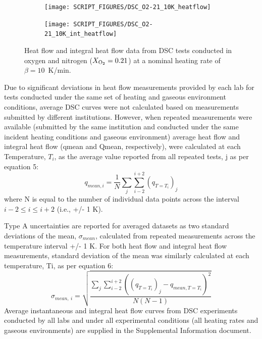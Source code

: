 \documentclass{book}
\begin{document}
\begin{figure}
\centering
\begin{subfigure}[b]{0.85\textwidth}
   \texttt{[image: SCRIPT\_FIGURES/DSC\_O2-21\_10K\_heatflow]}
   \caption{}
   \label{Fig:DSC_O2-21_10K_heatflow}
\end{subfigure}

\begin{subfigure}[b]{0.85\textwidth}
   \texttt{[image: SCRIPT\_FIGURES/DSC\_O2-21\_10K\_int\_heatflow]}
   \caption{}
   \label{Fig:DSC_O2-21_10K_int_heatflow}
\end{subfigure}

  \caption{Heat flow and integral heat flow data from DSC tests conducted in oxygen and nitrogen ($X_{\rm O_2}=0.21$) at a nominal heating rate of $\beta=10$~K/min.}
  \label{Fig:DSC_O2-21_10K}
\end{figure}



Due to significant deviations  in heat flow measurements provided by each lab for tests conducted under the same set of heating and gaseous environment conditions, average DSC curves were not calculated based on measurements submitted by different institutions. However, when repeated measurements were available (submitted by the same institution and conducted under the same incident heating conditions and gaseous environment) average heat flow and integral heat flow (qmean and Qmean, respectively), were calculated at each Temperature, $T_i$, as the average value reported from all repeated tests, j  as per equation 5:
\begin{equation}
   q_{mean,i}=\frac{1}{N}\sum_{j}\sum_{i-2}^{i+2}\left(q_{T=T_i}\right)_j
\end{equation}
where N is equal to the number of individual data points across the interval $i-2 \le i \le i+2$ (i.e., +/- 1 K).

Type A uncertainties are reported for averaged datasets as two standard deviations of the mean, $\sigma_{mean}$, calculated from repeated measurements across the temperature interval +/- 1 K. For both heat flow and integral heat flow measurements, standard deviation of the mean was similarly calculated at each temperature, Ti, as per equation 6:
\begin{equation}
   \sigma_{mean,\ i}=\sqrt{\frac{\sum_{j}\sum_{i-2}^{i+2}\left(\left(q_{T=T_i}\right)_j-q_{mean,T=T_i}\right)^2}{N\left(N-1\right)}}
\end{equation}
Average instantaneous and integral heat flow curves from DSC experiments conducted by all labs and under all experimental conditions (all heating rates and gaseous environments) are supplied in the Supplemental Information document.
\end{document}
